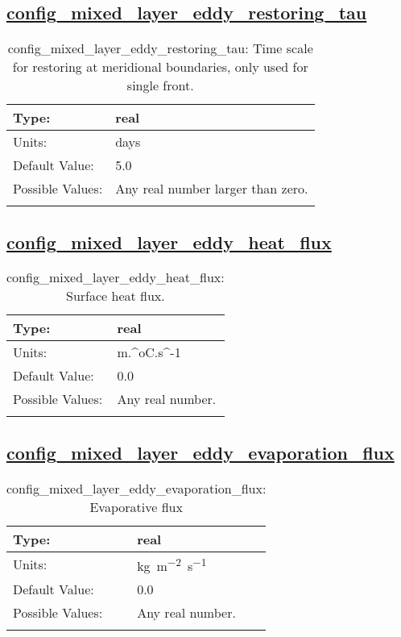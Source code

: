 \subsection[config\_mixed\_layer\_eddy\_restoring\_tau]{\hyperref[sec:nm_tab_mixed_layer_eddy]{config\_mixed\_layer\_eddy\_restoring\_tau}}
\label{subsec:nm_sec_config_mixed_layer_eddy_restoring_tau}
\begin{center}
\begin{longtable}{| p{2.0in} || p{4.0in} |}
    \hline
    Type: & real \\
    \hline
    Units: & \si{days} \\
    \hline
    Default Value: & 5.0 \\
    \hline
    Possible Values: & Any real number larger than zero. \\
    \hline
    \caption{config\_mixed\_layer\_eddy\_restoring\_tau: Time scale for restoring at meridional boundaries, only used for single front.}
\end{longtable}
\end{center}
\subsection[config\_mixed\_layer\_eddy\_heat\_flux]{\hyperref[sec:nm_tab_mixed_layer_eddy]{config\_mixed\_layer\_eddy\_heat\_flux}}
\label{subsec:nm_sec_config_mixed_layer_eddy_heat_flux}
\begin{center}
\begin{longtable}{| p{2.0in} || p{4.0in} |}
    \hline
    Type: & real \\
    \hline
    Units: & \si{m.^oC.s^{-1}} \\
    \hline
    Default Value: & 0.0 \\
    \hline
    Possible Values: & Any real number. \\
    \hline
    \caption{config\_mixed\_layer\_eddy\_heat\_flux: Surface heat flux.}
\end{longtable}
\end{center}
\subsection[config\_mixed\_layer\_eddy\_evaporation\_flux]{\hyperref[sec:nm_tab_mixed_layer_eddy]{config\_mixed\_layer\_eddy\_evaporation\_flux}}
\label{subsec:nm_sec_config_mixed_layer_eddy_evaporation_flux}
\begin{center}
\begin{longtable}{| p{2.0in} || p{4.0in} |}
    \hline
    Type: & real \\
    \hline
    Units: & \si{kg.m^{-2}.s^{-1}} \\
    \hline
    Default Value: & 0.0 \\
    \hline
    Possible Values: & Any real number. \\
    \hline
    \caption{config\_mixed\_layer\_eddy\_evaporation\_flux: Evaporative flux}
\end{longtable}
\end{center}
